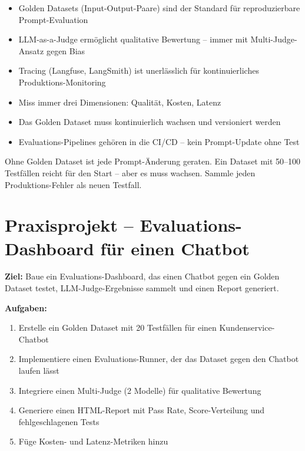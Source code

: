 \begin{zusammenfassung}
\begin{itemize}[leftmargin=*]
    \item Golden Datasets (Input-Output-Paare) sind der Standard für reproduzierbare Prompt-Evaluation
    \item LLM-as-a-Judge ermöglicht qualitative Bewertung -- immer mit Multi-Judge-Ansatz gegen Bias
    \item Tracing (Langfuse, LangSmith) ist unerlässlich für kontinuierliches Produktions-Monitoring
    \item Miss immer drei Dimensionen: Qualität, Kosten, Latenz
    \item Das Golden Dataset muss kontinuierlich wachsen und versioniert werden
    \item Evaluations-Pipelines gehören in die CI/CD -- kein Prompt-Update ohne Test
\end{itemize}
\end{zusammenfassung}

\begin{merke}
Ohne Golden Dataset ist jede Prompt-Änderung geraten. Ein Dataset mit 50--100 Testfällen reicht für den Start -- aber es muss wachsen. Sammle jeden Produktions-Fehler als neuen Testfall.
\end{merke}

\section{Praxisprojekt -- Evaluations-Dashboard für einen Chatbot}

\textbf{Ziel:} Baue ein Evaluations-Dashboard, das einen Chatbot gegen ein Golden Dataset testet, LLM-Judge-Ergebnisse sammelt und einen Report generiert.

\textbf{Aufgaben:}
\begin{enumerate}[leftmargin=*]
    \item Erstelle ein Golden Dataset mit 20 Testfällen für einen Kundenservice-Chatbot
    \item Implementiere einen Evaluations-Runner, der das Dataset gegen den Chatbot laufen lässt
    \item Integriere einen Multi-Judge (2 Modelle) für qualitative Bewertung
    \item Generiere einen HTML-Report mit Pass Rate, Score-Verteilung und fehlgeschlagenen Tests
    \item Füge Kosten- und Latenz-Metriken hinzu
\end{enumerate}

